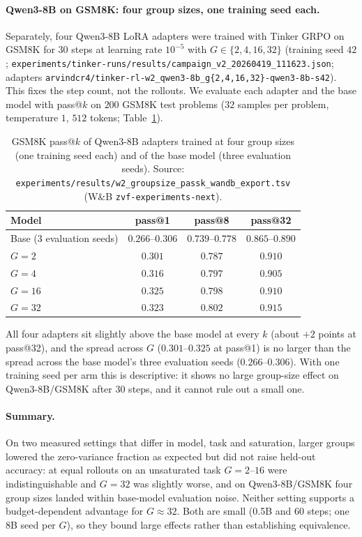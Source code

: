 \paragraph{Qwen3-8B on GSM8K: four group sizes, one training seed each.}
Separately, four Qwen3-8B LoRA adapters were trained with Tinker GRPO on GSM8K for
$30$ steps at learning rate $10^{-5}$ with $G\in\{2,4,16,32\}$ (training seed $42$;
\texttt{experiments/tinker-runs/results/campaign\_v2\_20260419\_111623.json};
adapters \texttt{arvindcr4/tinker-rl-w2\_qwen3-8b\_g\{2,4,16,32\}-qwen3-8b-s42}). This
fixes the step count, not the rollouts. We evaluate each adapter and the base
model with pass@$k$ on $200$ GSM8K test problems ($32$ samples per problem,
temperature $1$, $512$ tokens; Table~\ref{tab:groupsize-w2-passk}).

\begin{table}[htbp]
\centering
\small
\begin{tabular}{lccc}
\toprule
Model & pass@1 & pass@8 & pass@32 \\
\midrule
Base (3 evaluation seeds) & $0.266$--$0.306$ & $0.739$--$0.778$ & $0.865$--$0.890$ \\
$G{=}2$  & $0.301$ & $0.787$ & $0.910$ \\
$G{=}4$  & $0.316$ & $0.797$ & $0.905$ \\
$G{=}16$ & $0.325$ & $0.798$ & $0.910$ \\
$G{=}32$ & $0.323$ & $0.802$ & $0.915$ \\
\bottomrule
\end{tabular}
\caption{GSM8K pass@$k$ of Qwen3-8B adapters trained at four group sizes
(one training seed each) and of the base model (three evaluation seeds). Source:
\texttt{experiments/results/w2\_groupsize\_passk\_wandb\_export.tsv} (W\&B
\texttt{zvf-experiments-next}).}
\label{tab:groupsize-w2-passk}
\end{table}

All four adapters sit slightly above the base model at every $k$ (about $+2$ points
at pass@32), and the spread across $G$ ($0.301$--$0.325$ at pass@1) is no larger than
the spread across the base model's three evaluation seeds ($0.266$--$0.306$). With
one training seed per arm this is descriptive: it shows no large group-size effect
on Qwen3-8B/GSM8K after $30$ steps, and it cannot rule out a small one.

\paragraph{Summary.}
On two measured settings that differ in model, task and saturation, larger groups
lowered the zero-variance fraction as expected but did not raise held-out
accuracy: at equal rollouts on an unsaturated task $G{=}2$--$16$ were
indistinguishable and $G{=}32$ was slightly worse, and on Qwen3-8B/GSM8K four
group sizes landed within base-model evaluation noise. Neither setting supports a
budget-dependent advantage for $G\approx32$. Both are small (0.5B and
$60$ steps; one 8B seed per $G$), so they bound large effects rather than
establishing equivalence.
